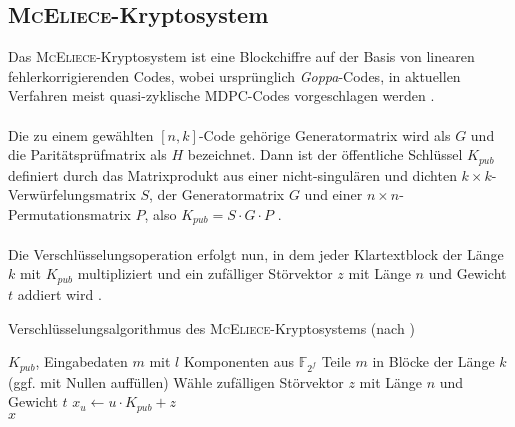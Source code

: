 \documentclass[utf8, biblatex]{lni}
\begin{document}
\subsection{\textsc{McEliece}-Kryptosystem}
Das \textsc{McEliece}-Kryptosystem ist eine Blockchiffre auf der Basis von linearen fehlerkorrigierenden Codes, wobei ursprünglich \textit{Goppa}-Codes, in aktuellen Verfahren meist quasi-zyklische MDPC-Codes vorgeschlagen werden \cite{McEliece1978} \cite{Misoczki2013}. \\\\
Die zu einem gewählten $[n, k]$-Code gehörige Generatormatrix wird als $G$ und die Paritätsprüfmatrix als $H$ bezeichnet. Dann ist der öffentliche Schlüssel $K_{pub}$ definiert durch das Matrixprodukt aus einer nicht-singulären und dichten $k \times k$-Verwürfelungsmatrix $S$, der Generatormatrix $G$ und einer $n \times n$-Permutationsmatrix $P$, also $K_{pub} = S \cdot G \cdot P$ \cite[S. 114]{McEliece1978}. \\\\
Die Verschlüsselungsoperation erfolgt nun, in dem jeder Klartextblock der Länge $k$ mit $K_{pub}$ multipliziert und ein zufälliger Störvektor $z$ mit Länge $n$ und Gewicht $t$ addiert wird \cite{McEliece1978}. 
\begin{algorithm}[h!]
\caption{Verschlüsselungsalgorithmus des \textsc{McEliece}-Kryptosystems (nach \parencite{McEliece1978})} \label{McElieceEnc}
\begin{algorithmic}[1]
\Require $K_{pub}$, Eingabedaten $m$ mit $l$ Komponenten aus $\mathbb{F}_{2^f}$
\State Teile $m$ in Blöcke der Länge $k$ (ggf. mit Nullen auffüllen)
	\State Wähle zufälligen Störvektor $z$ mit Länge $n$ und Gewicht $t$
	\State $x_u \gets u \cdot K_{pub} + z$
\EndFor \\
\Return $x$
\end{algorithmic}
\end{algorithm}\\
\printbibliography
\end{document}
